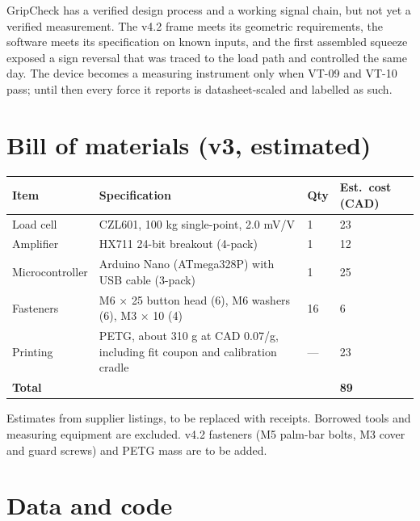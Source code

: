 \documentclass[10pt,a4paper]{article}
\begin{document}
GripCheck has a verified design process and a working signal chain, but not yet a verified measurement. The v4.2 frame meets its geometric requirements, the software meets its specification on known inputs, and the first assembled squeeze exposed a sign reversal that was traced to the load path and controlled the same day. The device becomes a measuring instrument only when VT-09 and VT-10 pass; until then every force it reports is datasheet-scaled and labelled as such.

\appendix
\section{Bill of materials (v3, estimated)}

\begin{center}\small
\begin{tabularx}{\linewidth}{@{}p{2.6cm}Lp{0.8cm}p{2.0cm}@{}}
\toprule
Item & Specification & Qty & Est.\ cost (CAD) \\
\midrule
Load cell & CZL601, 100 kg single-point, 2.0 mV/V & 1 & 23 \\
Amplifier & HX711 24-bit breakout (4-pack) & 1 & 12 \\
Microcontroller & Arduino Nano (ATmega328P) with USB cable (3-pack) & 1 & 25 \\
Fasteners & M6 × 25 button head (6), M6 washers (6), M3 × 10 (4) & 16 & 6 \\
Printing & PETG, about 310 g at CAD 0.07/g, including fit coupon and calibration cradle & — & 23 \\
\midrule
\textbf{Total} & & & \textbf{89} \\
\bottomrule
\end{tabularx}
\end{center}
Estimates from supplier listings, to be replaced with receipts. Borrowed tools and measuring equipment are excluded. v4.2 fasteners (M5 palm-bar bolts, M3 cover and guard screws) and PETG mass are to be added.

\section{Data and code}
\end{document}
